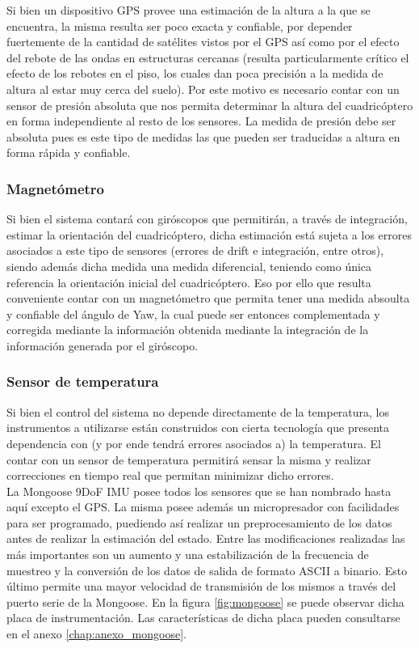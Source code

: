 \documentclass[main]{subfiles}
\begin{document}
Si bien un dispositivo GPS provee una estimaci\'on de la altura a la que se encuentra, la misma resulta ser poco exacta y confiable, por depender fuertemente de la cantidad de sat\'elites vistos por el GPS as\'i como por el efecto del rebote de las ondas en estructuras cercanas (resulta particularmente cr\'itico el efecto de los rebotes en el piso, los cuales dan poca precisi\'on a la medida de altura al estar muy cerca del suelo). Por este motivo es necesario contar con un sensor de presi\'on absoluta que nos permita determinar la altura del cuadric\'optero en forma independiente al resto de los sensores. La medida de presi\'on debe ser absoluta pues es este tipo de medidas las que pueden ser traducidas a altura en forma r\'apida y confiable.

\subsubsection{Magnet\'ometro}

Si bien el sistema contar\'a con gir\'oscopos que permitir\'an, a trav\'es de integraci\'on, estimar la orientaci\'on del cuadric\'optero, dicha estimaci\'on est\'a sujeta a los errores asociados a este tipo de sensores (errores de drift e integraci\'on, entre otros), siendo adem\'as dicha medida una medida diferencial, teniendo como \'unica referencia la orientaci\'on inicial del cuadric\'optero. Eso por ello que resulta conveniente contar con un magnet\'ometro que permita tener una medida absoulta y confiable del \'angulo de Yaw, la cual puede ser entonces complementada y corregida mediante la informaci\'on obtenida mediante la integraci\'on de la informaci\'on generada por el gir\'oscopo.

\subsubsection{Sensor de temperatura}

Si bien el control del sistema no depende directamente de la temperatura, los instrumentos a utilizarse est\'an construidos con cierta tecnolog\'ia que presenta dependencia con (y por ende tendr\'a errores asociados a) la temperatura. El contar con un sensor de temperatura permitir\'a sensar la misma y realizar correcciones en tiempo real que permitan minimizar dicho errores.\\

La Mongoose 9DoF IMU posee todos los sensores que se han nombrado hasta aqu\'i excepto el GPS. La misma posee adem\'as un micropresador con facilidades para ser programado, puediendo as\'i realizar un preprocesamiento de los datos antes de realizar la estimaci\'on del estado. Entre las modificaciones realizadas las m\'as importantes son un aumento y una estabilizaci\'on de la frecuencia de muestreo y la conversi\'on de los datos de salida de formato ASCII a binario. Esto \'ultimo permite una mayor velocidad de transmisi\'on de los mismos a trav\'es del puerto serie de la Mongoose. En la figura \ref{fig:mongoose} se puede observar dicha placa de instrumentaci\'on. Las caracter\'isticas de dicha placa pueden consultarse en el anexo  \ref{chap:anexo_mongoose}.
\end{document}
